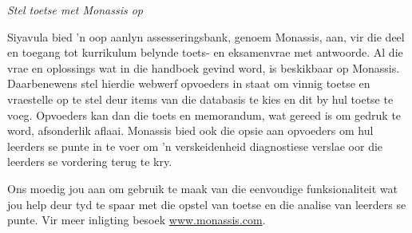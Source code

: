 
{\normalfont\sffamily\fontsize{22}\normalfont\itshape Stel toetse met Monassis op} \par

{\Large
Siyavula bied 'n oop aanlyn assesseringsbank, genoem Monassis, aan, vir die deel en toegang tot  kurrikulum belynde toets- en eksamenvrae met antwoorde. Al die vrae en oplossings wat in die handboek gevind word, is beskikbaar op Monassis. Daarbenewens stel hierdie webwerf opvoeders in staat om vinnig toetse en vraestelle op te stel deur items van die databasis te kies en dit by hul toetse te voeg. Opvoeders kan dan die toets en memorandum, wat gereed is om gedruk te word, afsonderlik aflaai. Monassis bied ook die opsie aan opvoeders om hul leerders se punte in te voer om 'n verskeidenheid diagnostiese verslae oor die leerders se vordering terug te kry.\par


\begin{figure}[h]
\begin{center}
\end{center}
\end{figure}


Ons moedig jou aan om gebruik te maak van die eenvoudige funksionaliteit wat jou help deur tyd te spaar met die opstel van toetse en die analise van leerders se punte. Vir meer inligting besoek \underline{www.monassis.com}.\par






}
